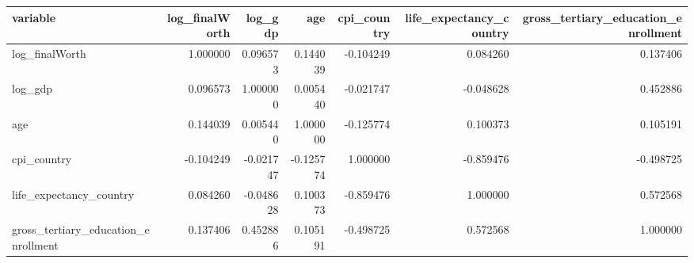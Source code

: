 \begin{tabular}{lrrrrrr}
\toprule
variable & log\_finalWorth & log\_gdp & age & cpi\_country & life\_expectancy\_country & gross\_tertiary\_education\_enrollment \\
\midrule
log\_finalWorth & 1.000000 & 0.096573 & 0.144039 & -0.104249 & 0.084260 & 0.137406 \\
log\_gdp & 0.096573 & 1.000000 & 0.005440 & -0.021747 & -0.048628 & 0.452886 \\
age & 0.144039 & 0.005440 & 1.000000 & -0.125774 & 0.100373 & 0.105191 \\
cpi\_country & -0.104249 & -0.021747 & -0.125774 & 1.000000 & -0.859476 & -0.498725 \\
life\_expectancy\_country & 0.084260 & -0.048628 & 0.100373 & -0.859476 & 1.000000 & 0.572568 \\
gross\_tertiary\_education\_enrollment & 0.137406 & 0.452886 & 0.105191 & -0.498725 & 0.572568 & 1.000000 \\
\bottomrule
\end{tabular}
